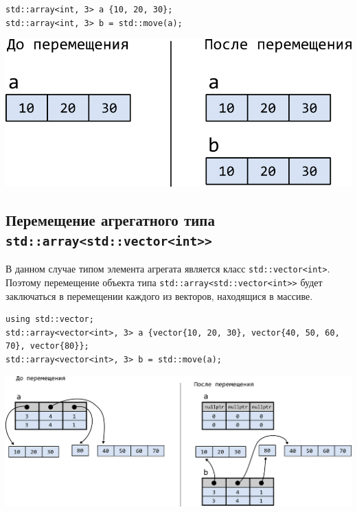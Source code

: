 \documentclass{article}
\begin{document}
\begin{minipage}{0.45\textwidth}
\begin{lstlisting}
std::array<int, 3> a {10, 20, 30};
std::array<int, 3> b = std::move(a);
\end{lstlisting}
\end{minipage}
\begin{minipage}{0.45\textwidth}
\begin{center}
\includegraphics[scale=1]{../images/move_array_int.png}
\end{center}
\end{minipage}


\subsection*{Перемещение агрегатного типа \texttt{std::array<std::vector<int>{}>}}
В данном случае типом элемента агрегата является класс \texttt{std::vector<int>}. Поэтому перемещение объекта типа \texttt{\texttt{std::array<std::vector<int>{}>}} будет заключаться в перемещении каждого из векторов, находящися в массиве.
\begin{lstlisting}
using std::vector;
std::array<vector<int>, 3> a {vector{10, 20, 30}, vector{40, 50, 60, 70}, vector{80}};
std::array<vector<int>, 3> b = std::move(a);
\end{lstlisting}
\begin{center}
\includegraphics[scale=1]{../images/move_array_vector.png}
\end{center}
\end{document}
